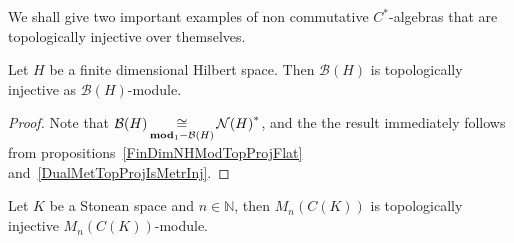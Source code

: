 We shall give two important examples of non commutative $C^*$-algebras that are
topologically injective over themselves.

\begin{proposition}\label{FinDimBHModTopInj} Let $H$ be a finite dimensional
Hilbert space. Then $\mathcal{B}(H)$ is topologically injective as
$\mathcal{B}(H)$-module. 
\end{proposition}
\begin{proof} Note that
$\mathcal{B}(H)\mathop{\mathbin{\cong}}\limits_{\mathbf{mod}_1-\mathcal{B}(H)}{\mathcal{N}(H)}^*$, and the
the result immediately follows from propositions~\ref{FinDimNHModTopProjFlat}
and~\ref{DualMetTopProjIsMetrInj}.
\end{proof}

\begin{proposition}\label{CKMatrixModTopInj} Let $K$ be a Stonean space and
$n\in\mathbb{N}$, then $M_n(C(K))$ is topologically injective
$M_n(C(K))$-module.
\end{proposition}
